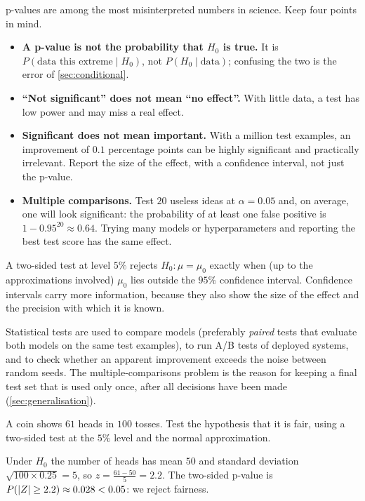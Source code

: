 \begin{pitfall}
p-values are among the most misinterpreted numbers in science. Keep four points
in mind.
\begin{itemize}
  \item \textbf{A p-value is not the probability that $H_0$ is true.} It is
    $P(\text{data this extreme} \mid H_0)$, not $P(H_0 \mid \text{data})$; confusing
    the two is the error of \cref{sec:conditional}.
  \item \textbf{``Not significant'' does not mean ``no effect''.} With little
    data, a test has low power and may miss a real effect.
  \item \textbf{Significant does not mean important.} With a million test
    examples, an improvement of $0.1$ percentage points can be highly significant
    and practically irrelevant. Report the size of the effect, with a confidence
    interval, not just the p-value.
  \item \textbf{Multiple comparisons.} Test $20$ useless ideas at $\alpha = 0.05$
    and, on average, one will look significant: the probability of at least one
    false positive is $1 - 0.95^{20} \approx 0.64$. Trying many models or
    hyperparameters and reporting the best test score has the same effect.
\end{itemize}
\end{pitfall}

\begin{remark}
A two-sided test at level $5\%$ rejects $H_0\colon\mu = \mu_0$ exactly when (up to
the approximations involved) $\mu_0$ lies outside the $95\%$ confidence interval.
Confidence intervals carry more information, because they also show the size of
the effect and the precision with which it is known.
\end{remark}

\begin{mlnote}
Statistical tests are used to compare models (preferably \emph{paired} tests that
evaluate both models on the same test examples), to run A/B tests of deployed
systems, and to check whether an apparent improvement exceeds the noise between
random seeds. The multiple-comparisons problem is the reason for keeping a final
test set that is used only once, after all decisions have been made
(\cref{sec:generalisation}).
\end{mlnote}

\sectionexercises

\begin{exercise}
A coin shows $61$ heads in $100$ tosses. Test the hypothesis that it is fair,
using a two-sided test at the $5\%$ level and the normal approximation.
\end{exercise}
\begin{solution}
Under $H_0$ the number of heads has mean $50$ and standard deviation
$\sqrt{100\times0.25} = 5$, so $z = \tfrac{61 - 50}{5} = 2.2$. The two-sided
p-value is $P(\lvert Z\rvert \ge 2.2) \approx 0.028 < 0.05$: we reject fairness.
\end{solution}

